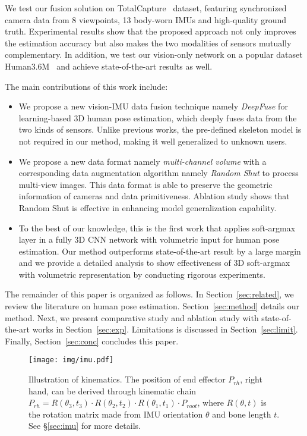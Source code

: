 \documentclass[10pt,twocolumn,letterpaper]{article}
\begin{document}
We test our fusion solution on TotalCapture~\cite{trumble2017total} dataset, featuring synchronized camera data from 8 viewpoints, 13 body-worn IMUs and high-quality ground truth. Experimental results show that the proposed approach not only improves the estimation accuracy but also makes the two modalities of sensors mutually complementary. 
In addition, we test our vision-only network on a popular dataset Human3.6M~\cite{h36m_pami} and achieve state-of-the-art results as well. 

The main contributions of this work include:
\vspace{-5pt}
\begin{itemize}
\item We propose a new vision-IMU data fusion technique namely \emph{DeepFuse} for learning-based 3D human pose estimation, which deeply fuses data from the two kinds of sensors. Unlike previous works, the pre-defined skeleton model is not required in our method, making it well generalized to unknown users. 
\vspace{-3pt}
\item We propose a new data format namely \emph{multi-channel volume} with a corresponding data augmentation algorithm namely \emph{Random Shut} to process multi-view images. This data format is able to preserve the geometric information of cameras and data primitiveness. Ablation study shows that Random Shut is effective in enhancing model generalization capability.
\vspace{-3pt}
\item To the best of our knowledge, this is the first work that applies soft-argmax layer in a fully 3D CNN network with volumetric input for human pose estimation. Our method outperforms state-of-the-art result by a large margin and we provide a detailed analysis to show effectiveness of 3D soft-argmax with volumetric representation by conducting rigorous experiments.
\vspace{-3pt}
\end{itemize}

The remainder of this paper is organized as follows. In Section~\ref{sec:related}, we review the literature on human pose estimation. Section~\ref{sec:method} details our method. Next, we present comparative study and ablation study with state-of-the-art works in Section~\ref{sec:exp}. Limitations is discussed in Section~\ref{sec:limit}. Finally, Section~\ref{sec:conc} concludes this paper.

\begin{figure}
\begin{center}
\texttt{[image: img/imu.pdf]}
\end{center}
    \vspace{-0.6cm}
   \caption{Illustration of kinematics. The position of end effector $P_{rh}$, right hand, can be derived through kinematic chain $P_{rh} = R(\theta_3,t_3) \cdot R(\theta_2,t_2) \cdot R(\theta_1,t_1) \cdot P_{root}$, where $R(\theta,t)$ is the rotation matrix made from IMU orientation $\theta$ and bone length $t$. See \S\ref{sec:imu} for more details.}
\label{fig:skeleton}
\vspace*{-14pt}
\end{figure}
\end{document}

